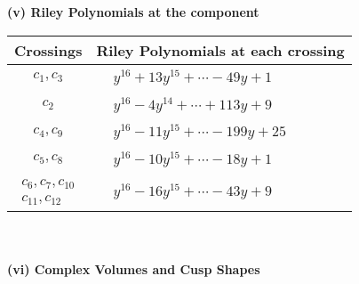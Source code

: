 \documentclass[1p]{elsarticle_modified}
\theoremstyle{definition}
\begin{document}
\flushleft \textbf{(v) Riley Polynomials at the component}\newline \\
\begin{tabular}{m{50pt}|m{274pt}}
Crossings & \hspace{64pt}Riley Polynomials at each crossing \\
\hline $$\begin{aligned}c_{1},c_{3}\end{aligned}$$&$\begin{aligned}
&y^{16}+13 y^{15}+\cdots-49 y+1
\end{aligned}$\\
\hline $$\begin{aligned}c_{2}\end{aligned}$$&$\begin{aligned}
&y^{16}-4 y^{14}+\cdots+113 y+9
\end{aligned}$\\
\hline $$\begin{aligned}c_{4},c_{9}\end{aligned}$$&$\begin{aligned}
&y^{16}-11 y^{15}+\cdots-199 y+25
\end{aligned}$\\
\hline $$\begin{aligned}c_{5},c_{8}\end{aligned}$$&$\begin{aligned}
&y^{16}-10 y^{15}+\cdots-18 y+1
\end{aligned}$\\
\hline $$\begin{aligned}c_{6},c_{7},c_{10}\\c_{11},c_{12}\end{aligned}$$&$\begin{aligned}
&y^{16}-16 y^{15}+\cdots-43 y+9
\end{aligned}$\\
\hline
\end{tabular}\\~\\
\newpage\flushleft \textbf{(vi) Complex Volumes and Cusp Shapes}
\end{document}

